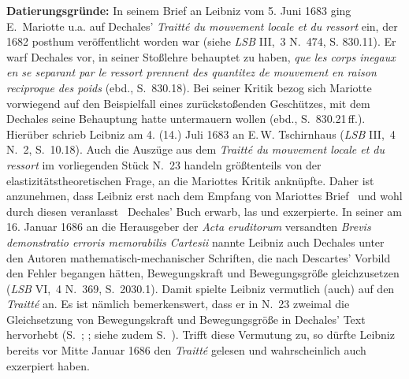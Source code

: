 \begin{ledgroup}
\footnotesize 
\pstart
\noindent
\textbf{Datierungsgründe:}
In seinem Brief an Leibniz vom 5. Juni 1683 ging E.~Mariotte\protect{} u.a. auf Dechales'\protect{} \textit{Traitté du mouvement locale et du ressort}\cite{01998} ein, der 1682 posthum veröffentlicht worden war (siehe \textit{LSB} III,~3 N.~474, S. 830.11\cite{01290}).
Er warf Dechales vor, in seiner Stoßlehre behauptet zu haben, \textit{que les corps inegaux en se separant par le ressort prennent des quantitez de mouvement en raison reciproque des poids} (ebd., S.~830.18).
Bei seiner Kritik bezog sich Mariotte vorwiegend auf den Beispielfall eines zurückstoßenden Geschützes, mit dem Dechales seine Behauptung hatte untermauern wollen (ebd., S.~830.21\,ff.).
Hierüber schrieb Leibniz am 4. (14.) Juli 1683 an E.\,W. Tschirnhaus (\textit{LSB} III,~4 N.~2, S.~10.18).%
\protect{}
Auch die Auszüge aus dem \textit{Traitté du mouvement locale et du ressort} im vorliegenden Stück N.~23 handeln größtenteils von der elastizitätstheoretischen Frage, an die Mariottes Kritik anknüpfte.
Daher ist anzunehmen, dass Leibniz erst nach dem Empfang von Mariottes Brief \textendash\ und wohl durch diesen veranlasst \textendash\ Dechales' Buch erwarb, las und exzerpierte.
\newline%
\indent%
In seiner am 16. Januar 1686 an die Herausgeber der \textit{Acta eruditorum} versandten \textit{Brevis demon\-stra\-tio erroris memorabilis Cartesii} nannte Leibniz auch Dechales\protect{} unter den Autoren \glqq mathematisch-mechanischer Schriften\grqq, die nach Descartes'\protect{} Vorbild den Fehler begangen hätten, Bewegungskraft und Bewegungsgröße gleichzusetzen (\textit{LSB} VI,~4 N.~369,\cite{01099} S.~2030.1).
Damit spielte Leibniz vermutlich (auch) auf den \textit{Traitté} an.
Es ist nämlich bemerkenswert, dass er in N.~23 zweimal die Gleichsetzung von Bewegungskraft und Bewegungsgröße in Dechales' Text hervorhebt
(S.~;
;
siehe zudem S.~).
Trifft diese Vermutung zu, so dürfte Leibniz bereits vor Mitte Januar 1686 den \textit{Traitté} gelesen und wahrscheinlich auch exzerpiert haben.
\pend
\end{ledgroup}
